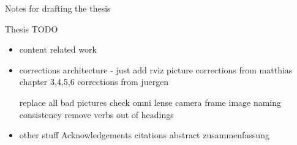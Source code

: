 \clearemptydoublepage

{}

\begin{center}
	\huge{Notes for drafting the thesis}
\end{center}


Thesis TODO
\begin{itemize}
\item content
\subitem related work
\item corrections
\subitem architecture - just add rviz picture
\subitem corrections from matthias chapter 3,4,5,6
\subitem corrections from juergen

\subitem replace all bad pictures
\subitem check omni lense camera frame image naming consistency
\subitem remove verbs out of headings
\item other stuff
\subitem Acknowledgements
\subitem citations
\subitem abstract
\subitem zusammenfassung
\end{itemize}
